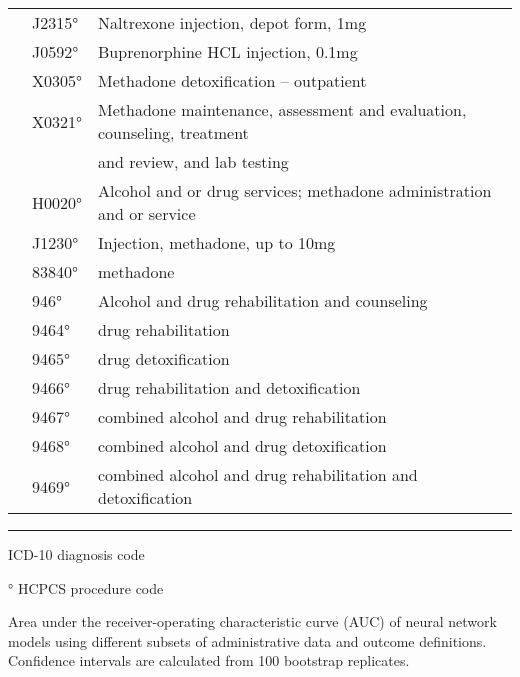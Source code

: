 \documentclass[9pt,twoside]{pnas-new}
\begin{document}
\begin{table}
\begin{tabular}{lll}
 & J2315° & Naltrexone injection, depot form, 1mg \\
 & J0592° & Buprenorphine HCL injection, 0.1mg \\
 & X0305° & Methadone detoxification – outpatient \\
 & X0321° & Methadone maintenance, assessment and evaluation, counseling, treatment \\
 &  & and review, and lab testing \\
 & H0020° & Alcohol and or drug services; methadone administration and or service \\
 & J1230° & Injection, methadone, up to 10mg \\
 & 83840° & methadone \\
 & 946° & Alcohol and drug rehabilitation and counseling \\
 & 9464° & drug rehabilitation \\
 & 9465° & drug detoxification \\
 & 9466° & drug rehabilitation and detoxification \\
 & 9467° & combined alcohol and drug rehabilitation \\
 & 9468° & combined alcohol and drug detoxification \\
 & 9469° & combined alcohol and drug rehabilitation and detoxification \\[1em]
\end{tabular}
\hrule
\begin{tablenotes}
\footnotesize
\item * ICD-10 diagnosis code
\item ° HCPCS procedure code
\end{tablenotes}
\end{table}

\begin{table}
\caption{Area under the receiver-operating characteristic curve (AUC) of neural network models using different subsets of administrative data and outcome definitions. Confidence intervals are calculated from 100 bootstrap replicates.}
\centering

\end{table}
\end{document}
